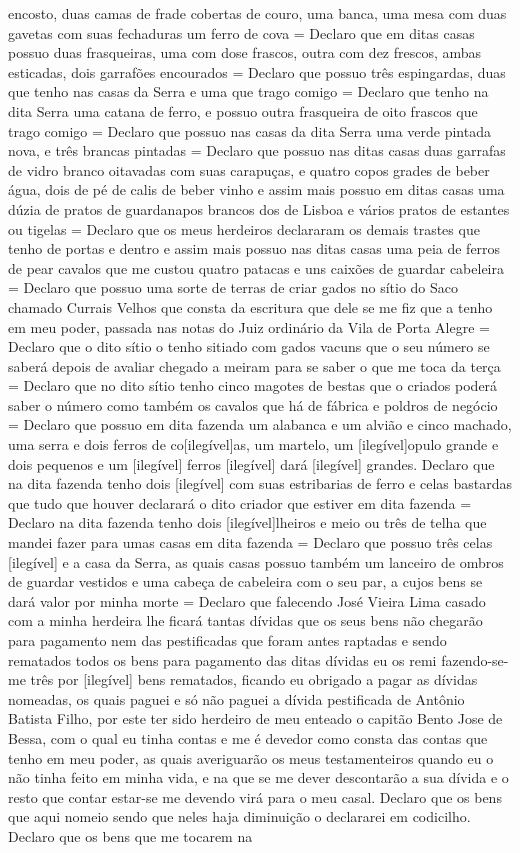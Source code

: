 \begin{refsection}
encosto, duas camas de frade cobertas de couro, uma banca, uma mesa com duas gavetas com suas fechaduras um ferro de cova = Declaro que em ditas casas possuo duas frasqueiras, uma com dose frascos, outra com dez frescos, ambas esticadas, dois garrafões encourados = Declaro que possuo três espingardas, duas que tenho nas casas da Serra e uma que trago comigo = Declaro que tenho  na dita Serra uma catana de ferro, e possuo outra frasqueira de oito frascos que trago comigo = Declaro que possuo nas casas da dita Serra uma verde pintada nova, e três brancas pintadas = Declaro que possuo nas ditas casas duas garrafas de vidro branco oitavadas com suas carapuças, e quatro copos grades de beber água, dois de pé de calis de beber vinho e assim mais possuo em ditas casas uma dúzia de pratos de guardanapos brancos dos de Lisboa e vários pratos de estantes ou tigelas = Declaro que os meus herdeiros declararam os demais trastes que tenho de portas e dentro e assim mais possuo nas ditas casas uma peia de ferros de pear cavalos que me custou quatro patacas e uns caixões de guardar cabeleira = Declaro que possuo uma sorte de terras de criar gados no sítio do Saco chamado Currais Velhos que consta da escritura que dele se me fiz que a tenho em meu poder, passada nas notas do Juiz ordinário da Vila de Porta Alegre = Declaro que o dito sítio o tenho sitiado com gados vacuns que o seu número se saberá depois de avaliar chegado a meiram para se saber o que me toca da terça = Declaro que no dito sítio tenho cinco magotes de bestas que o criados poderá saber o número como também os cavalos que há de fábrica e poldros de negócio = Declaro que possuo em dita fazenda um alabanca e um alvião e cinco machado, uma serra e dois ferros de co[ilegível]as, um martelo, um [ilegível]opulo grande e dois pequenos e um [ilegível] ferros [ilegível] dará [ilegível] grandes. Declaro que na dita fazenda tenho dois [ilegível] com suas estribarias de ferro e celas bastardas que tudo que houver declarará o dito criador que estiver em dita fazenda = Declaro na dita fazenda tenho dois [ilegível]lheiros e meio ou três de telha que mandei fazer para umas casas em dita fazenda = Declaro que possuo três celas [ilegível] e a casa da Serra, as quais casas possuo também um lanceiro de ombros de guardar vestidos e uma cabeça de cabeleira com o seu par, a cujos bens se dará valor por minha morte = Declaro que falecendo José Vieira Lima casado com a minha herdeira lhe ficará tantas dívidas que os seus bens não chegarão para pagamento nem das pestificadas que foram antes raptadas e sendo rematados todos os bens para pagamento das ditas dívidas eu os remi fazendo-se-me três por [ilegível] bens rematados, ficando eu obrigado a pagar as dívidas nomeadas, os quais paguei e só não paguei a dívida pestificada de Antônio Batista Filho, por este ter sido herdeiro de meu enteado o capitão Bento Jose de Bessa, com o qual eu tinha contas e me é devedor como consta das contas que tenho em meu poder, as quais averiguarão os meus testamenteiros quando eu o não tinha feito em minha vida, e na que se me dever descontarão a sua dívida e o resto que contar estar-se me devendo virá para o meu casal. Declaro que os bens que aqui nomeio sendo que neles haja diminuição o declararei em codicilho. Declaro que os bens que me tocarem na 
\end{refsection}

